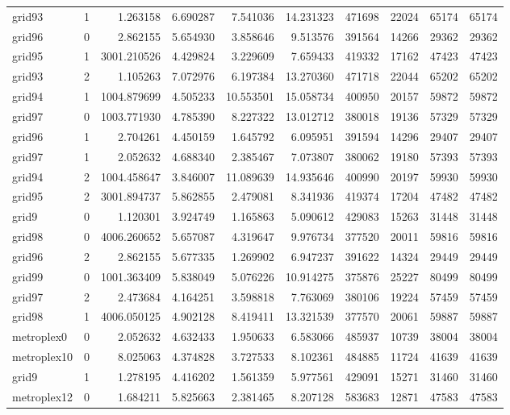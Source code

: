 \begin{longtable}{|l|r|r|r|r|r|r|r|r|r|}
grid93 & 1 & 1.263158 & 6.690287 & 7.541036 & 14.231323 & 471698 & 22024 & 65174 & 65174 \\
grid96 & 0 & 2.862155 & 5.654930 & 3.858646 & 9.513576 & 391564 & 14266 & 29362 & 29362 \\
grid95 & 1 & 3001.210526 & 4.429824 & 3.229609 & 7.659433 & 419332 & 17162 & 47423 & 47423 \\
grid93 & 2 & 1.105263 & 7.072976 & 6.197384 & 13.270360 & 471718 & 22044 & 65202 & 65202 \\
grid94 & 1 & 1004.879699 & 4.505233 & 10.553501 & 15.058734 & 400950 & 20157 & 59872 & 59872 \\
grid97 & 0 & 1003.771930 & 4.785390 & 8.227322 & 13.012712 & 380018 & 19136 & 57329 & 57329 \\
grid96 & 1 & 2.704261 & 4.450159 & 1.645792 & 6.095951 & 391594 & 14296 & 29407 & 29407 \\
grid97 & 1 & 2.052632 & 4.688340 & 2.385467 & 7.073807 & 380062 & 19180 & 57393 & 57393 \\
grid94 & 2 & 1004.458647 & 3.846007 & 11.089639 & 14.935646 & 400990 & 20197 & 59930 & 59930 \\
grid95 & 2 & 3001.894737 & 5.862855 & 2.479081 & 8.341936 & 419374 & 17204 & 47482 & 47482 \\
grid9 & 0 & 1.120301 & 3.924749 & 1.165863 & 5.090612 & 429083 & 15263 & 31448 & 31448 \\
grid98 & 0 & 4006.260652 & 5.657087 & 4.319647 & 9.976734 & 377520 & 20011 & 59816 & 59816 \\
grid96 & 2 & 2.862155 & 5.677335 & 1.269902 & 6.947237 & 391622 & 14324 & 29449 & 29449 \\
grid99 & 0 & 1001.363409 & 5.838049 & 5.076226 & 10.914275 & 375876 & 25227 & 80499 & 80499 \\
grid97 & 2 & 2.473684 & 4.164251 & 3.598818 & 7.763069 & 380106 & 19224 & 57459 & 57459 \\
grid98 & 1 & 4006.050125 & 4.902128 & 8.419411 & 13.321539 & 377570 & 20061 & 59887 & 59887 \\
metroplex0 & 0 & 2.052632 & 4.632433 & 1.950633 & 6.583066 & 485937 & 10739 & 38004 & 38004 \\
metroplex10 & 0 & 8.025063 & 4.374828 & 3.727533 & 8.102361 & 484885 & 11724 & 41639 & 41639 \\
grid9 & 1 & 1.278195 & 4.416202 & 1.561359 & 5.977561 & 429091 & 15271 & 31460 & 31460 \\
metroplex12 & 0 & 1.684211 & 5.825663 & 2.381465 & 8.207128 & 583683 & 12871 & 47583 & 47583 \\

\end{longtable}
